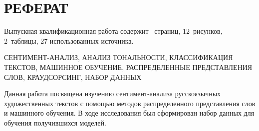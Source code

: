 \chapter*{РЕФЕРАТ}









%
%

\bigskip\par
Выпускная квалификационная работа содержит \pageref*{LastPage}~страниц, 12~рисунков,                                        2~таблицы, 27 использованных источника.

\bigskip\par
СЕНТИМЕНТ-АНАЛИЗ, АНАЛИЗ ТОНАЛЬНОСТИ, КЛАССИФИКАЦИЯ ТЕКСТОВ, МАШИННОЕ ОБУЧЕНИЕ, РАСПРЕДЕЛЕННЫЕ ПРЕДСТАВЛЕНИЯ СЛОВ, КРАУДСОРСИНГ, НАБОР ДАННЫХ

\bigskip\par
Данная работа посвящена изучению сентимент-анализа русскоязычных художественных текстов с помощью методов распределенного представления слов и машинного обучения. В ходе исследования был сформирован набор данных для обучения получившихся моделей.

